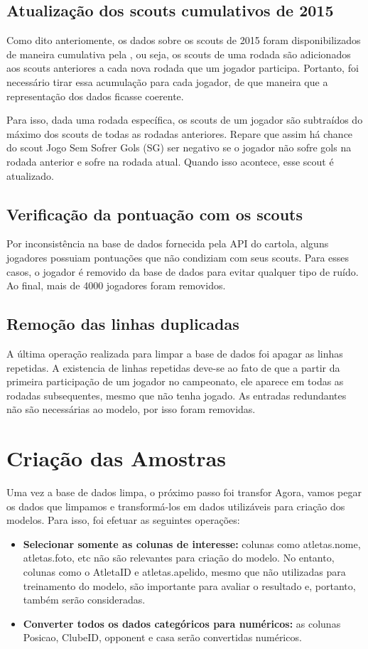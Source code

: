 \documentclass[conference]{IEEEtran}
\begin{document}
\subsection{Atualização dos scouts cumulativos de 2015}
Como dito anteriomente, os dados sobre os scouts de 2015 foram disponibilizados de maneira cumulativa pela , ou seja, os scouts de uma rodada são adicionados aos scouts anteriores a cada nova rodada que um jogador participa. Portanto, foi necessário tirar essa acumulação para cada jogador, de que maneira que a representação dos dados ficasse coerente.

Para isso, dada uma rodada específica, os scouts de um jogador são subtraídos do máximo dos scouts de todas as rodadas anteriores. Repare que assim há chance do scout Jogo Sem Sofrer Gols (SG) ser negativo se o jogador não sofre gols na rodada anterior e sofre na rodada atual. Quando isso acontece, esse scout é atualizado.


\subsection{Verificação da pontuação com os scouts}

Por inconsistência na base de dados fornecida pela API do cartola, alguns jogadores possuiam pontuações que não condiziam com seus scouts. Para esses casos, o jogador é removido da base de dados para evitar qualquer tipo de ruído.
Ao final, mais de 4000 jogadores foram removidos.

\subsection{Remoção das linhas duplicadas}

A última operação realizada para limpar a base de dados foi apagar as linhas repetidas. A existencia de linhas repetidas deve-se ao fato de que a partir da primeira participação de um jogador no campeonato, ele aparece em todas as rodadas subsequentes, mesmo que não tenha jogado. As entradas redundantes não são necessárias ao modelo, por isso foram removidas.


\section{Criação das Amostras}

Uma vez a base de dados limpa, o próximo passo foi transfor
Agora, vamos pegar os dados que limpamos e transformá-los em dados utilizáveis para criação dos modelos. Para isso, foi efetuar as seguintes operações:
\begin{itemize}
	\item \textbf{Selecionar somente as colunas de interesse:} colunas como atletas.nome, atletas.foto, etc não são relevantes para criação do modelo. No entanto, colunas como o AtletaID e atletas.apelido, mesmo que não utilizadas para treinamento do modelo, são importante para avaliar o resultado e, portanto, também serão consideradas.

	\item \textbf{Converter todos os dados categóricos para numéricos:} as colunas Posicao, ClubeID, opponent e casa serão convertidas numéricos.
\end{itemize}
\end{document}

